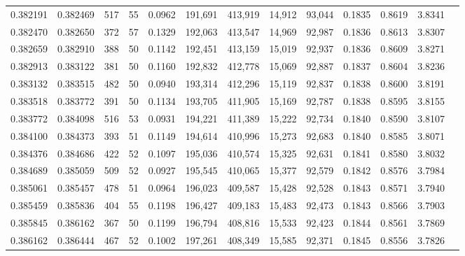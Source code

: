 \begin{tabular}{rrrrrrrrrrrrr}
0.382191 & 0.382469 &   517 &  55 &                                     0.0962 & 191,691 & 413,919 &  14,912 &  93,044 & 0.1835 & 0.8619 & 3.8341 \\
0.382470 & 0.382650 &   372 &  57 &                                     0.1329 & 192,063 & 413,547 &  14,969 &  92,987 & 0.1836 & 0.8613 & 3.8307 \\
0.382659 & 0.382910 &   388 &  50 &                                     0.1142 & 192,451 & 413,159 &  15,019 &  92,937 & 0.1836 & 0.8609 & 3.8271 \\
0.382913 & 0.383122 &   381 &  50 &                                     0.1160 & 192,832 & 412,778 &  15,069 &  92,887 & 0.1837 & 0.8604 & 3.8236 \\
0.383132 & 0.383515 &   482 &  50 &                                     0.0940 & 193,314 & 412,296 &  15,119 &  92,837 & 0.1838 & 0.8600 & 3.8191 \\
0.383518 & 0.383772 &   391 &  50 &                                     0.1134 & 193,705 & 411,905 &  15,169 &  92,787 & 0.1838 & 0.8595 & 3.8155 \\
0.383772 & 0.384098 &   516 &  53 &                                     0.0931 & 194,221 & 411,389 &  15,222 &  92,734 & 0.1840 & 0.8590 & 3.8107 \\
0.384100 & 0.384373 &   393 &  51 &                                     0.1149 & 194,614 & 410,996 &  15,273 &  92,683 & 0.1840 & 0.8585 & 3.8071 \\
0.384376 & 0.384686 &   422 &  52 &                                     0.1097 & 195,036 & 410,574 &  15,325 &  92,631 & 0.1841 & 0.8580 & 3.8032 \\
0.384689 & 0.385059 &   509 &  52 &                                     0.0927 & 195,545 & 410,065 &  15,377 &  92,579 & 0.1842 & 0.8576 & 3.7984 \\
0.385061 & 0.385457 &   478 &  51 &                                     0.0964 & 196,023 & 409,587 &  15,428 &  92,528 & 0.1843 & 0.8571 & 3.7940 \\
0.385459 & 0.385836 &   404 &  55 &                                     0.1198 & 196,427 & 409,183 &  15,483 &  92,473 & 0.1843 & 0.8566 & 3.7903 \\
0.385845 & 0.386162 &   367 &  50 &                                     0.1199 & 196,794 & 408,816 &  15,533 &  92,423 & 0.1844 & 0.8561 & 3.7869 \\
0.386162 & 0.386444 &   467 &  52 &                                     0.1002 & 197,261 & 408,349 &  15,585 &  92,371 & 0.1845 & 0.8556 & 3.7826 \\

\end{tabular}
